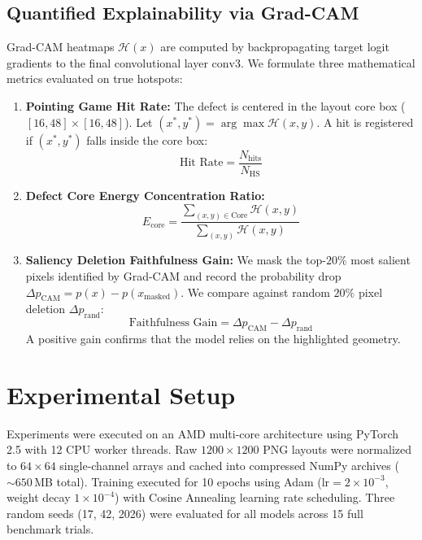 \documentclass[conference]{IEEEtran}
\begin{document}
\subsection{Quantified Explainability via Grad-CAM}
Grad-CAM heatmaps $\mathcal{H}(x)$ are computed by backpropagating target logit gradients to the final convolutional layer $\text{conv3}$. We formulate three mathematical metrics evaluated on true hotspots:
\begin{enumerate}
    \item \textbf{Pointing Game Hit Rate:} The defect is centered in the layout core box ($[16, 48] \times [16, 48]$). Let $(x^*, y^*) = \arg\max \mathcal{H}(x, y)$. A hit is registered if $(x^*, y^*)$ falls inside the core box:
    \begin{equation}
    \text{Hit Rate} = \frac{N_{\text{hits}}}{N_{\text{HS}}}
    \end{equation}
    \item \textbf{Defect Core Energy Concentration Ratio:}
    \begin{equation}
    E_{\text{core}} = \frac{\sum_{(x,y) \in \text{Core}} \mathcal{H}(x, y)}{\sum_{(x,y)} \mathcal{H}(x, y)}
    \end{equation}
    \item \textbf{Saliency Deletion Faithfulness Gain:} We mask the top-$20\%$ most salient pixels identified by Grad-CAM and record the probability drop $\Delta p_{\text{CAM}} = p(x) - p(x_{\text{masked}})$. We compare against random $20\%$ pixel deletion $\Delta p_{\text{rand}}$:
    \begin{equation}
    \text{Faithfulness Gain} = \Delta p_{\text{CAM}} - \Delta p_{\text{rand}}
    \end{equation}
    A positive gain confirms that the model relies on the highlighted geometry.
\end{enumerate}

\section{Experimental Setup}
Experiments were executed on an AMD multi-core architecture using PyTorch 2.5 with 12 CPU worker threads. Raw $1200 \times 1200$ PNG layouts were normalized to $64 \times 64$ single-channel arrays and cached into compressed NumPy archives ($\sim 650$\,MB total). Training executed for 10 epochs using Adam ($\text{lr} = 2 \times 10^{-3}$, weight decay $1 \times 10^{-4}$) with Cosine Annealing learning rate scheduling. Three random seeds (17, 42, 2026) were evaluated for all models across 15 full benchmark trials.
\end{document}
